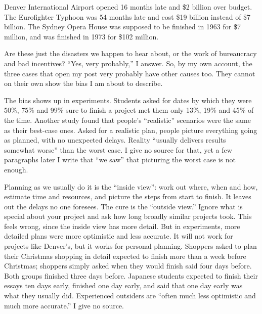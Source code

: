 
Denver International Airport opened 16 months late and \$2 billion over budget. The Eurofighter Typhoon was 54 months late and cost \$19 billion instead of \$7 billion. The Sydney Opera House was supposed to be finished in 1963 for \$7 million, and was finished in 1973 for \$102 million.

Are these just the disasters we happen to hear about, or the work of bureaucracy and bad incentives? ``Yes, very probably,'' I answer. So, by my own account, the three cases that open my post very probably have other causes too. They cannot on their own show the bias I am about to describe. 

The bias shows up in experiments. Students asked for dates by which they were 50\%, 75\% and 99\% sure to finish a project met them only 13\%, 19\% and 45\% of the time. Another study found that people's ``realistic'' scenarios were the same as their best-case ones. Asked for a realistic plan, people picture everything going as planned, with no unexpected delays. Reality ``usually delivers results somewhat worse'' than the worst case. I give no source for that, yet a few paragraphs later I write that ``we saw'' that picturing the worst case is not enough. 

Planning as we usually do it is the ``inside view'': work out where, when and how, estimate time and resources, and picture the steps from start to finish. It leaves out the delays no one foresees. The cure is the ``outside view.'' Ignore what is special about your project and ask how long broadly similar projects took. This feels wrong, since the inside view has more detail. But in experiments, more detailed plans were more optimistic and less accurate. It will not work for projects like Denver's, but it works for personal planning. Shoppers asked to plan their Christmas shopping in detail expected to finish more than a week before Christmas; shoppers simply asked when they would finish said four days before. Both groups finished three days before. Japanese students expected to finish their essays ten days early, finished one day early, and said that one day early was what they usually did. Experienced outsiders are ``often much less optimistic and much more accurate.'' I give no source. 

